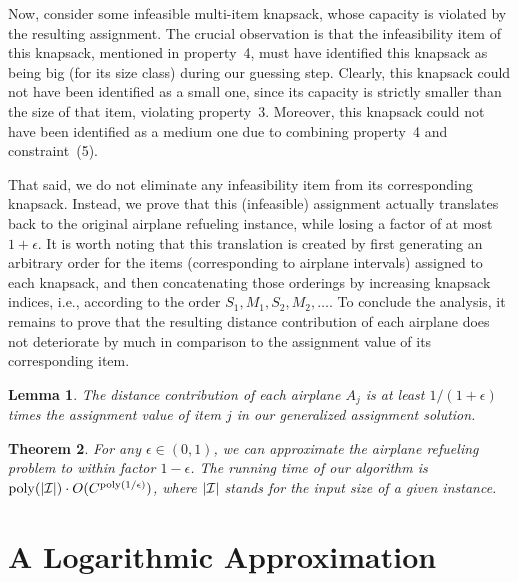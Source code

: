 \documentclass[11pt]{article}
\theoremstyle{plain}
\newtheorem{theorem}{Theorem}[section]
\newtheorem{lemma}[theorem]{Lemma}
\theoremstyle{definition}
\newcommand{\poly}{\mathrm{poly}}
\begin{document}
Now, consider some infeasible multi-item knapsack, whose capacity is violated by the resulting assignment. The crucial observation is that the infeasibility item of this knapsack, mentioned in property~4, must have identified this knapsack as being big (for its size class) during our guessing step. Clearly, this knapsack could not have been identified as a small one, since its capacity is strictly smaller than the size of that item, violating property~3. Moreover, this knapsack could not have been identified as a medium one due to combining property~4 and constraint~(5).

That said, we do not eliminate any infeasibility item from its corresponding knapsack. Instead, we prove that this (infeasible) assignment actually translates back to the original airplane refueling instance, while losing a factor of at most $1+\epsilon$. It is worth noting that this translation is created by first generating an arbitrary order for the items (corresponding to airplane intervals) assigned to each knapsack, and then concatenating those orderings by increasing knapsack indices, i.e., according to the order $S_1, M_1, S_2, M_2, \ldots$. To conclude the analysis, it remains to prove that the resulting distance contribution of each airplane does not deteriorate by much in comparison to the assignment value of its corresponding item.

\begin{lemma} \label{lem:items_vs_airplanes}
The distance contribution of each airplane $A_j$ is at least $1 /( 1+\epsilon )$ times the assignment value of item $j$ in our generalized assignment solution.
\end{lemma}

\begin{theorem} \label{thm:pseudoapprox}
For any $\epsilon \in (0,1)$, we can approximate the airplane refueling problem to within factor $1-\epsilon$. The running time of our algorithm is $\poly( |{\cal I}| ) \cdot O( C^{ \poly(1/\epsilon) } )$, where $|\cal I|$ stands for the input size of a given instance.
\end{theorem}




\appendix


\section{A Logarithmic Approximation} \label{app:log_approx}
\end{document}

